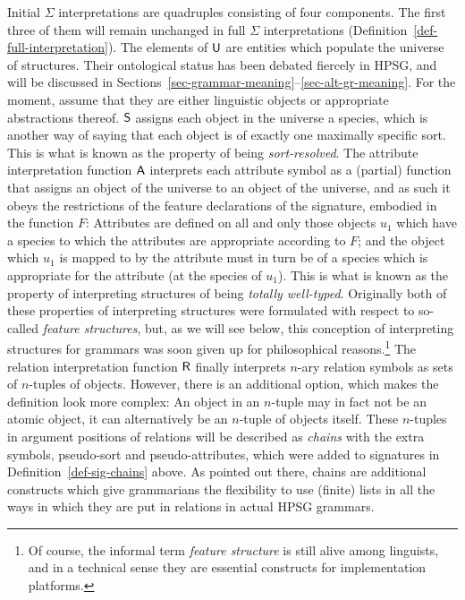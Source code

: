 \documentclass[output=paper
                ,modfonts
                ,nonflat
	        ,collection
	        ,collectionchapter
	        ,collectiontoclongg
 	        ,biblatex
                ,babelshorthands
                ,newtxmath
                ,draftmode
                ,colorlinks, citecolor=brown
]{./langsci/langscibook}
\begin{document}
{Initial $\Sigma$ interpretations are quadruples consisting of four
components. The first three of them will remain unchanged in full
$\Sigma$ interpretations (Definition~\ref{def-full-interpretation}). The elements of $\mathsf{U}$
are entities which populate the universe of structures. Their ontological
status has been debated fiercely in HPSG, and will be discussed in
Sections~\ref{sec-grammar-meaning}--\ref{sec-alt-gr-meaning}. For the
moment, assume that they are either linguistic objects or appropriate
abstractions thereof. $\mathsf{S}$ assigns each object in the universe
a species, which is another way of saying that each object is of exactly
one maximally specific sort. This is what is known as the property of being
\emph{sort-resolved}. The attribute interpretation function $\mathsf{A}$
interprets each attribute symbol as a (partial) function that assigns an
object of the universe to an object of the universe, and as such it
obeys the restrictions of the feature declarations of the signature,
embodied in the function $F$: Attributes are defined on all and only
those objects $u_1$ which have a species to which the attributes are appropriate
according to $F$; and the object which $u_1$ is mapped to by the attribute
must in turn be of a species which is appropriate for the attribute
(at the species of $u_1$). This is what is known as the property of
interpreting structures of being \emph{totally well-typed}. Originally both
of these properties of interpreting structures were formulated with
respect to so-called \emph{feature structures}, but, as we will see below,
this conception of interpreting structures for grammars
was soon given up for philosophical reasons.\footnote{Of course, the
  informal term \emph{feature structure} is still alive among
  linguists, and in a technical sense they are essential constructs
  for implementation platforms.} The relation interpretation function
$\mathsf{R}$ finally interprets $n$-ary
relation symbols as sets of $n$-tuples of objects. However, there is
an additional option, which makes the definition look more complex: An
object in an $n$-tuple may in fact not be an atomic object, it can
alternatively be an $n$-tuple of objects itself. These $n$-tuples in
argument positions of relations will be described as \emph{chains}
with the extra symbols, pseudo-sort and pseudo-attributes, which were
added to signatures in
Definition~\ref{def-sig-chains} above.  As pointed out there, chains
are additional constructs which give grammarians the flexibility to
use (finite) lists in all the ways in which they are put in relations
in actual HPSG grammars. %

}
\end{document}
